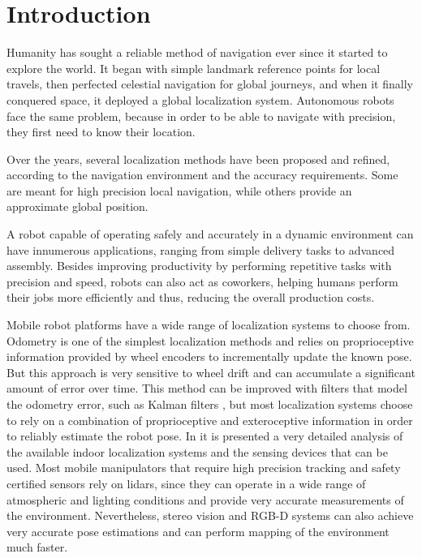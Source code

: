 \section{Introduction}\label{sec:introduction}

Humanity has sought a reliable method of navigation ever since it started to explore the world. It began with simple landmark reference points for local travels, then perfected celestial navigation for global journeys, and when it finally conquered space, it deployed a global localization system. Autonomous robots face the same problem, because in order to be able to navigate with precision, they first need to know their location.

Over the years, several localization methods have been proposed and refined, according to the navigation environment and the accuracy requirements. Some are meant for high precision local navigation, while others provide an approximate global position.

A robot capable of operating safely and accurately in a dynamic environment can have innumerous applications, ranging from simple delivery tasks to advanced assembly. Besides improving productivity by performing repetitive tasks with precision and speed, robots can also act as coworkers, helping humans perform their jobs more efficiently and thus, reducing the overall production costs.

Mobile robot platforms have a wide range of localization systems to choose from. Odometry is one of the simplest localization methods and relies on proprioceptive information provided by wheel encoders to incrementally update the known pose. But this approach is very sensitive to wheel drift and can accumulate a significant amount of error over time. This method can be improved with filters that model the odometry error, such as Kalman filters \cite{Wan2002}, but most localization systems choose to rely on a combination of proprioceptive and exteroceptive information in order to reliably estimate the robot pose. In \cite{Mautz2012} it is presented a very detailed analysis of the available indoor localization systems and the sensing devices that can be used. Most mobile manipulators that require high precision tracking and safety certified sensors rely on \glspl{lidar}, since they can operate in a wide range of atmospheric and lighting conditions and provide very accurate measurements of the environment. Nevertheless, stereo vision and RGB-D systems can also achieve very accurate pose estimations and can perform mapping of the environment much faster.

